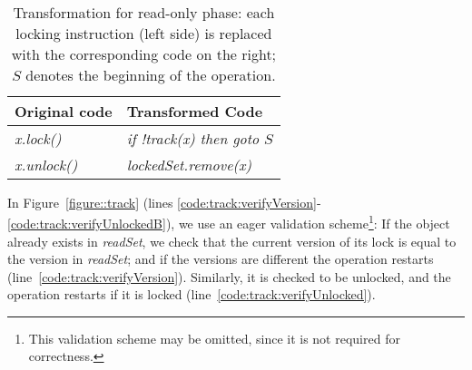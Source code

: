 \begin{table}
\codesize
\ttfamily
{\tt
\begin{center}
\begin{tabular}{|l|l|}
\hline
\textbf{Original code} & \textbf{Transformed Code}\\
\hline
\textit{x.lock()}&
\textit{if !track(x) then goto $S$}
\\
\hline
\textit{x.unlock()}&
\textit{lockedSet.remove(x)}
\\
\hline
\end{tabular}
\end{center}
}
\caption{Transformation for read-only phase:
each locking instruction (left side) is replaced with the corresponding code on the right;
 $S$  denotes the beginning of the operation.
}
\label{Ta:readOnlyTransformation}
\end{table}

In Figure~\ref{figure::track} (lines \ref{code:track:verifyVersion}-\ref{code:track:verifyUnlockedB}), we use an eager validation scheme\footnote{This validation scheme may be omitted, since it is not required for correctness.}: 
If the object already exists in \emph{readSet}, we check that the current version of its lock is equal
to the version in \emph{readSet}; and if the versions are different  the operation restarts (line~\ref{code:track:verifyVersion}).
Similarly, it is  checked to be unlocked, and the operation restarts if it is locked (line~\ref{code:track:verifyUnlocked}).


